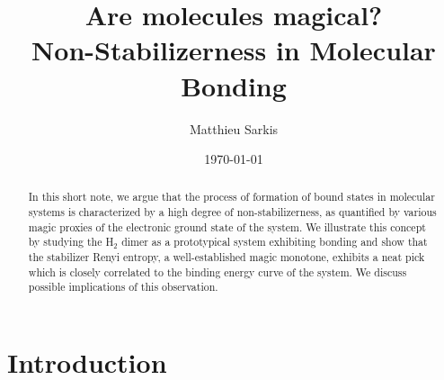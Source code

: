 \documentclass[aps,prl,twocolumn,groupedaddress, reprint,floatfix,nofootinbib,longbibliography]{revtex4-2}
\begin{document}
    \title{Are molecules magical?\\[0.2em]
    \small Non-Stabilizerness in Molecular Bonding}
    \author{Matthieu Sarkis}
    \date{\today}

\begin{abstract}
    In this short note, we argue that the process of formation of bound states in molecular systems is characterized by a high degree of non-stabilizerness, as quantified by various magic proxies of the electronic ground state of the system. We illustrate this concept by studying the H$_2$ dimer as a prototypical system exhibiting bonding and show that the stabilizer Renyi entropy, a well-established magic monotone, exhibits a neat pick which is closely correlated to the binding energy curve of the system. We discuss possible implications of this observation.
\end{abstract}

\maketitle

\section{Introduction}
\end{document}
